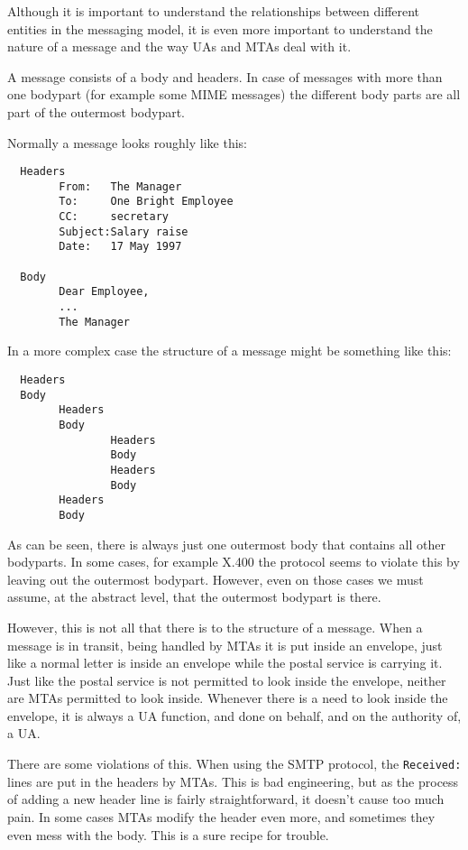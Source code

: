 Although it is important to understand the relationships between different 
entities in the messaging model, it is even more important to understand the 
nature of a message and the way UAs and MTAs deal with it.

A message consists of a body and headers. In case of messages with more 
than one bodypart (for example some MIME messages) the different body 
parts are all part of the outermost bodypart.

Normally a message looks roughly like this:

\begin{verbatim}
  Headers
        From:   The Manager
        To:     One Bright Employee
        CC:     secretary
        Subject:Salary raise
        Date:   17 May 1997

  Body
        Dear Employee,
        ...
        The Manager
\end{verbatim}

In a more complex case the structure of a message might be something like this:

\begin{verbatim}
  Headers
  Body
        Headers
        Body
                Headers
                Body
                Headers
                Body
        Headers
        Body
\end{verbatim}

As can be seen, there is always just one outermost body that contains 
all other bodyparts. In some cases, for example X.400 the protocol 
seems to violate this by leaving out the outermost bodypart. However, 
even on those cases we must assume, at the abstract level, 
that the outermost bodypart is there.

However, this is not all that there is to the structure of a message. 
When a message is in transit, being handled by MTAs it is put inside 
an envelope, just like a normal letter is inside an envelope while 
the postal service is carrying it. Just like the postal service is not 
permitted to look inside the envelope, neither are MTAs permitted 
to look inside. Whenever there is a need to look inside the envelope, 
it is always a UA function, and done on behalf, and on the authority of, a UA.

There are some violations of this. When using the SMTP protocol, the 
{\tt Received:} lines are put in the headers by MTAs. This is bad 
engineering, but as the process of adding a new header line is fairly 
straightforward, it doesn't cause too much pain. In some cases MTAs 
modify the header even more, and sometimes they even mess with the body. 
This is a sure recipe for trouble.



